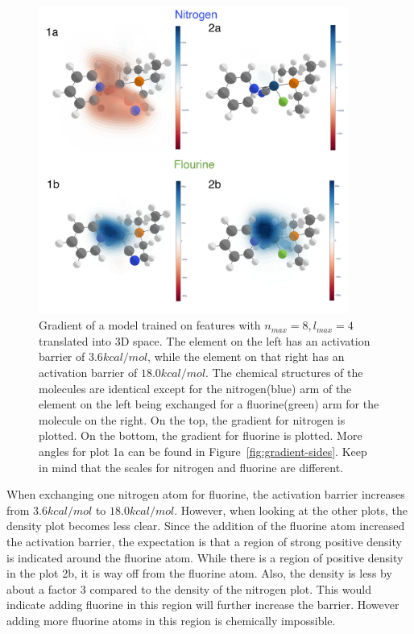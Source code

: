 \begin{figure}[H]
  \centering
  \includegraphics[width=0.9\textwidth]{figures/evaluation/GradientComp.png}
  \caption[Comparison of local gradients]{
      Gradient of a model trained on features with $n_{max}=8, l_{max}=4$ translated into 3D space.
      The element on the left has an activation barrier of $3.6 kcal/mol$, while the element on that right
      has an activation barrier of $18.0 kcal/mol$.
      The chemical structures of the molecules are identical except for the nitrogen(blue) arm of the element
      on the left being exchanged for a fluorine(green) arm for the molecule on the right.
      On the top, the gradient for nitrogen is plotted. On the bottom, the gradient for fluorine is plotted.
      More angles for plot 1a can be found in Figure~\ref{fig:gradient-sides}.
      Keep in mind that the scales for nitrogen and fluorine are different.
   }
  \label{fig:snap-gradient}
\end{figure}

When exchanging one nitrogen atom for fluorine, the activation barrier increases from $3.6 kcal/mol$ to $18.0kcal/mol$.
However, when looking at the other plots, the density plot becomes less clear.
Since the addition of the fluorine atom increased the activation barrier, the expectation is that a region of strong positive
density is indicated around the fluorine atom.
While there is a region of positive density in the plot 2b, it is way off from the fluorine atom.
Also, the density is less by about a factor 3 compared to the density of the nitrogen plot.
This would indicate adding fluorine in this region will further increase the barrier.
However adding more fluorine atoms in this region is chemically impossible. %
\\

